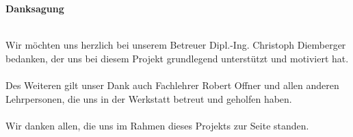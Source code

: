 \documentclass[titlepage,12pt,twoside]{article}
\begin{document}
\newpage
\thispagestyle{empty}
\clearpage\mbox{}\clearpage


\thispagestyle{empty}

\begin{center}
\Large{\textbf{Danksagung}} 
\end{center}

\hspace{2cm}
\\
Wir möchten uns herzlich bei unserem Betreuer Dipl.-Ing. Christoph Diemberger bedanken, 
der uns bei diesem Projekt grundlegend unterstützt und motiviert hat. \\
\\
Des Weiteren gilt unser Dank auch Fachlehrer Robert Offner und allen anderen Lehrpersonen, 
die uns in der Werkstatt betreut und geholfen haben. \\
\\
Wir danken allen, die uns im Rahmen dieses Projekts zur Seite standen.      

\newpage
\thispagestyle{empty}
\clearpage\mbox{}\clearpage


\thispagestyle{empty}
	
\end{document}
